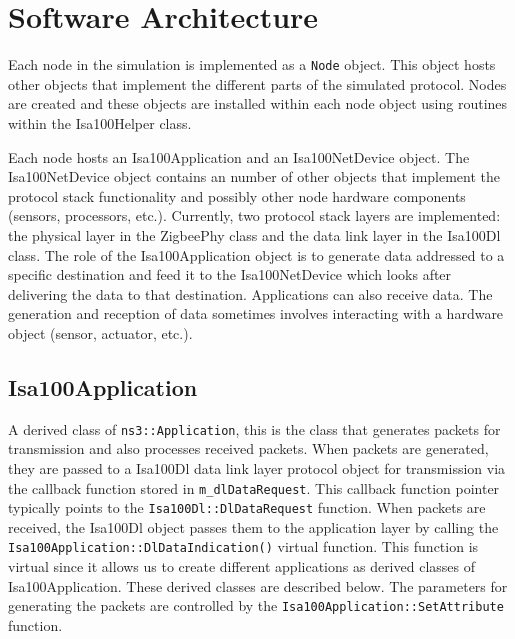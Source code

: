 \documentclass[12pt,letterpaper]{article}
\begin{document}
\section{Software Architecture}
\label{sec:arch}


Each node in the simulation is implemented as a {\tt Node} object.  This object hosts other objects that implement the different parts of the simulated protocol.  Nodes are created and these objects are installed within each node object using routines within the Isa100Helper class.

Each node hosts an Isa100Application and an Isa100NetDevice object.  The Isa100NetDevice object contains an number of other objects that implement the protocol stack functionality and possibly other node hardware components (sensors, processors, etc.).  Currently, two protocol stack layers are implemented: the physical layer in the ZigbeePhy class and the data link layer in the Isa100Dl class.  The role of the Isa100Application object is to generate data addressed to a specific destination and feed it to the Isa100NetDevice which looks after delivering the data to that destination.   Applications can also receive data. The generation and reception of data sometimes involves interacting with a hardware object (sensor, actuator, etc.).





\subsection{Isa100Application}

A derived class of {\tt ns3::Application}, this is the class that generates packets for transmission and also processes received packets.  When packets are generated, they are passed to a Isa100Dl data link layer protocol object for transmission via the callback function stored in {\tt m\_dlDataRequest}.  This callback function pointer typically points to the {\tt Isa100Dl::DlDataRequest} function.  When packets are received, the Isa100Dl object passes them to the application layer by calling the {\tt Isa100Application::DlDataIndication()} virtual function.  This function is virtual since it allows us to create different applications as derived classes of Isa100Application.  These derived classes are described below.  The parameters for generating the packets are controlled by the {\tt Isa100Application::SetAttribute} function.
\end{document}
